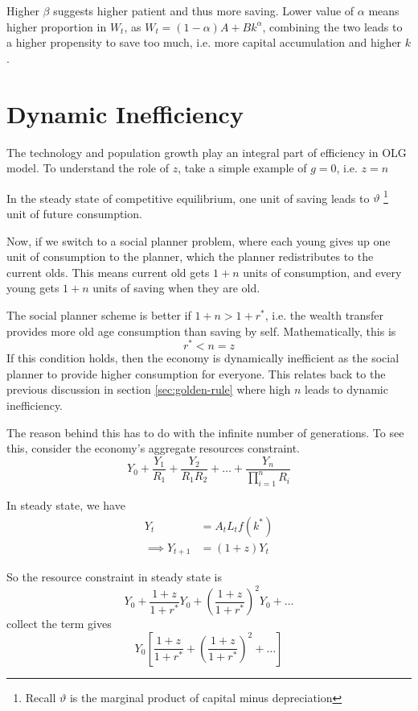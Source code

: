 \documentclass[twocolumn, fleqn]{article}
\begin{document}
		Higher $\beta$ suggests higher patient and thus more saving.
		Lower value of $\alpha$ means higher proportion in $W_t$, as
		$W_t = (1-\alpha)A+Bk^\alpha$, combining the two leads to a higher propensity to save too
		much, i.e. more capital accumulation and higher $k$.

	\section{Dynamic Inefficiency}\label{sec:dynamic-inefficiency}
		The technology and population growth play an integral part of efficiency in OLG model.
		To understand the role of $z$, take a simple example of $g=0$, i.e. $z=n$

		In the steady state of competitive equilibrium, one unit of saving leads to $\vartheta$
		\footnote{Recall $\vartheta$ is the marginal product of capital minus depreciation} unit of future consumption.

		Now, if we switch to a social planner problem, where each young gives up one unit of consumption to the
		planner, which the planner redistributes to the current olds.
		This means current old gets $1+n$ units of consumption, and every young gets $1+n$ units of saving when they
		are old.

		The social planner scheme is better if $1+n > 1+r^\ast$, i.e. the wealth transfer provides more old age
		consumption than saving by self.
		Mathematically, this is \[r^\ast < n =z\]
		If this condition holds, then the economy is dynamically inefficient as the social planner to provide higher
		consumption for everyone.
		This relates back to the previous discussion in section \ref{sec:golden-rule} where high $n$ leads to dynamic
		inefficiency.

		The reason behind this has to do with the infinite number of generations.
		To see this, consider the economy's aggregate resources constraint.
		\[Y_0 + \frac{Y_1}{R_1}+\frac{Y_2}{R_1 R_2}+\ldots+\frac{Y_n}{\prod_{i=1}^n R_i}\]

		In steady state, we have
		\begin{align*}
			Y_t &= A_t L_t f(k^\ast)\\
			\implies Y_{t+1} &= (1+z) Y_t
		\end{align*}

		So the resource constraint in steady state is
		\[Y_0 + \frac{1+z}{1+r^\ast} Y_0 + \left( \frac{1+z}{1+r^\ast} \right)^2 Y_0+\ldots\]
		collect the term gives
		\[Y_0\left[ \frac{1+z}{1+r^\ast} + \left( \frac{1+z}{1+r^\ast} \right)^2 +\ldots \right]\]
\end{document}
